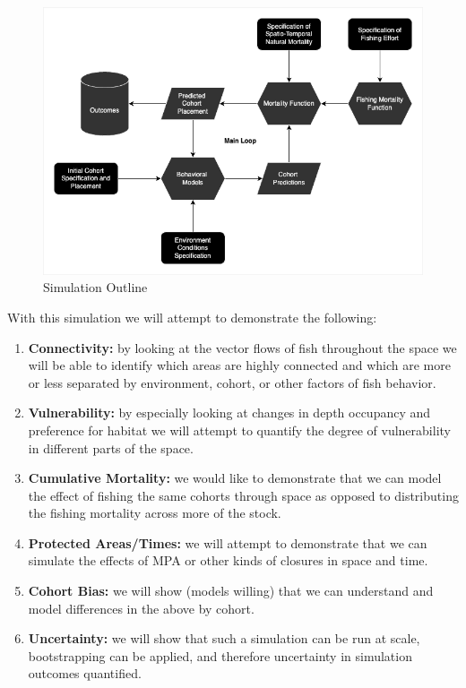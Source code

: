 \documentclass[11pt]{article}
\begin{document}
\begin{figure}[h!] 
  \includegraphics[width=\linewidth]{simulation.png}
  \caption{Simulation Outline}
  \label{fig:simulation}
\end{figure}


With this simulation we will attempt to demonstrate the following:

\begin{enumerate}
\item \textbf{Connectivity:} by looking at the vector flows of fish throughout the space we will be able to identify which areas are highly connected and which are more or less separated by environment, cohort, or other factors of fish behavior.
\item \textbf{Vulnerability:} by especially looking at changes in depth occupancy and preference for habitat we will attempt to quantify the degree of vulnerability in different parts of the space. 
\item \textbf{Cumulative Mortality:} we would like to demonstrate that we can model the effect of fishing the same cohorts through space as opposed to distributing the fishing mortality across more of the stock. 
\item \textbf{Protected Areas/Times:} we will attempt to demonstrate that we can simulate the effects of MPA or other kinds of closures in space and time. 
\item \textbf{Cohort Bias:} we will show (models willing) that we can understand and model differences in the above by cohort.
\item \textbf{Uncertainty:} we will show that such a simulation can be run at scale, bootstrapping can be applied, and therefore uncertainty in simulation outcomes quantified. 
\end{enumerate}
\end{document}
